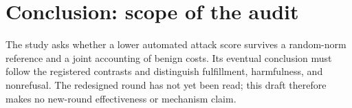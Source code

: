 \section*{Conclusion: scope of the audit}
The study asks whether a lower automated attack score survives a random-norm reference and a joint accounting of benign costs. Its eventual conclusion must follow the registered contrasts and distinguish fulfillment, harmfulness, and nonrefusal. The redesigned round has not yet been read; this draft therefore makes no new-round effectiveness or mechanism claim.
